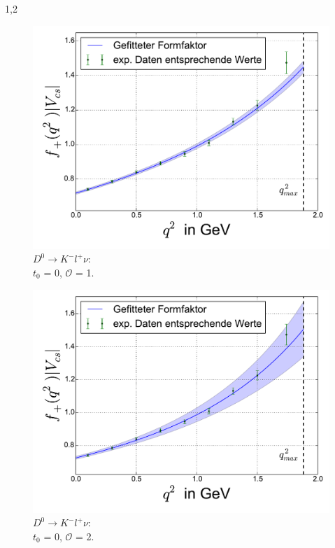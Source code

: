 \documentclass[11pt,a4paper,twoside]{report}
\begin{document}
\begin{spacing}{1,2}
 
 \begin{minipage}[H]{0.45\textwidth}
 \begin{figure}[H]
 \includegraphics[width=1\textwidth]{Fit/D0-1Ord-0.pdf}
 \caption{$D^0\rightarrow K^- l^+ \nu$: \\$t_0$ = 0, $\mathcal{O}$ = 1.}
 \label{pic_D0-1Ord-0}
 \end{figure}
 \end{minipage}
 \hfill
 \begin{minipage}[H]{0.45\textwidth}
 \begin{figure}[H]
 \includegraphics[width=1\textwidth]{Fit/D0-2Ord-0.pdf}
 \caption{$D^0\rightarrow K^- l^+ \nu$: \\$t_0$ = 0, $\mathcal{O}$ = 2.}
 \label{pic_D0-2Ord-0}
 \end{figure}
 \end{minipage}
 

\end{spacing}
\end{document}
